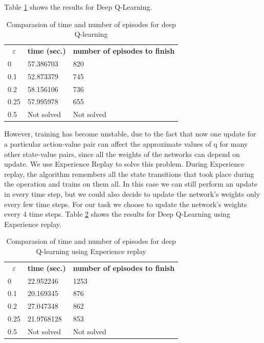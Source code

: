 \documentclass[a4paper, twoside, english]{article}
\begin{document}
\newpage

Table \ref{table:4} shows the results for Deep Q-Learning.\\

\begin{table}[h!]
	\begin{tabular}{lll}
		\multicolumn{1}{c}{\textbf{$\varepsilon$}} & \textbf{time (sec.)} & \textbf{number of episodes to finish} \\
		0                                & 57.386703            & 820                                   \\
		0.1                              & 52.873379            & 745                                   \\
		0.2                              & 58.156106            & 736                                   \\
		0.25                             & 57.995978            & 655                                   \\
		0.5                              & Not solved           & Not solved                           
	\end{tabular}
	\caption{Comparasion of time and number of episodes for deep Q-learning}
	\label{table:4}
\end{table}

However, training has become unstable, due to the fact that now one update for a particular action-value pair can affect the approximate values of q for many other state-value pairs, since all the weights of the networks can depend on update. 
We use Experience Replay to solve this problem. During Experience replay, the algorithm remembers all the state transitions that took place during the operation and trains on them all. In this case we can still perform an update in every time step, but we could also decide to update the network's weights only every few time steps. For our task we choose to update the network's weights every 4 time steps. Table \ref{table:5} shows the results for Deep Q-Learning using Experience replay.\\

\begin{table}[h!]
	\begin{tabular}{lll}
		\multicolumn{1}{c}{\textbf{$\varepsilon$}} & \textbf{time (sec.)} & \textbf{number of episodes to finish} \\
		0                                & 22.952246            & 1253                                  \\
		0.1                              & 20.169345            & 876                                   \\
		0.2                              & 27.047348            & 862                                   \\
		0.25                             & 21.9768128           & 853                                   \\
		0.5                              & Not solved           & Not solved                           
	\end{tabular}
	\caption{Comparasion of time and number of episodes for deep Q-learning using Experience replay}
	\label{table:5}
\end{table}
\end{document}
